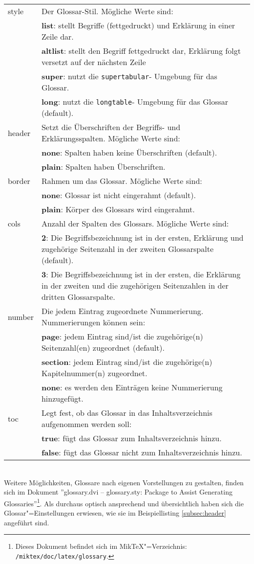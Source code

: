 \begin{tabularx}{\textwidth}{lX}
			style &Der Glossar-Stil. Mögliche Werte sind:\\
						&\textbf{list}: stellt Begriffe (fettgedruckt) und Erklärung in einer Zeile dar.\\
						&\textbf{altlist}: stellt den Begriff fettgedruckt dar, Erklärung folgt versetzt auf der nächsten Zeile\\
						&\textbf{super}: nutzt die \texttt{supertabular}- Umgebung für das Glossar.\\
						&\textbf{long}: nutzt die \texttt{longtable}- Umgebung für das Glossar (default).\\
			header &Setzt die Überschriften der Begriffs- und Erklärungsspalten. Mögliche Werte sind:\\
					  &\textbf{none}: Spalten haben keine Überschriften (default).\\
					  &\textbf{plain}: Spalten haben Überschriften.\\
		  border &Rahmen um das Glossar. Mögliche Werte sind:\\
		  			&\textbf{none}: Glossar ist nicht eingerahmt (default).\\
		  			&\textbf{plain}: Körper des Glossars wird eingerahmt.\\		  
			cols	& Anzahl der Spalten des Glossars. Mögliche Werte sind:\\ 
						&\textbf{2}: Die Begriffsbezeichnung ist in der ersten, Erklärung und zugehörige Seitenzahl in der zweiten Glossarspalte (default).\\ 
						&\textbf{3}: Die Begriffsbezeichnung ist in der ersten, die Erklärung in der zweiten und die zugehörigen Seitenzahlen in der dritten Glossarspalte.\\
		  number &Die jedem Eintrag zugeordnete Nummerierung. Nummerierungen können sein:\\
		  			&\textbf{page}: jedem Eintrag sind/ist die zugehörige(n) Seitenzahl(en) zugeordnet (default).\\
		  			&\textbf{section}: jedem Eintrag sind/ist die zugehörige(n) Kapitelnummer(n) zugeordnet.\\
		  			&\textbf{none}: es werden den Einträgen keine Nummerierung hinzugefügt.\\
		  toc &Legt fest, ob das Glossar in das Inhaltsverzeichnis aufgenommen werden soll:\\
		  		&\textbf{true}: fügt das Glossar zum Inhaltsverzeichnis hinzu.\\
		  		&\textbf{false}: fügt das Glossar nicht zum Inhaltsverzeichnis hinzu.
\end{tabularx}
\vspace{1em}
\\
Weitere Möglichkeiten, Glossare nach eigenen Vorstellungen zu gestalten, finden sich im
Dokument ''glossary.dvi -- glossary.sty: \DMLLaTeX{} Package to Assist Generating Glossaries''\footnote{Dieses Dokument befindet sich im Mik\TeX"=Verzeichnis: \verb~/miktex/doc/latex/glossary~.}. 
Als durchaus optisch ansprechend und übersichtlich haben sich die Glossar"=Einstellungen erwiesen, wie sie im Beispiellisting \ref{subsec:header} angeführt sind.
